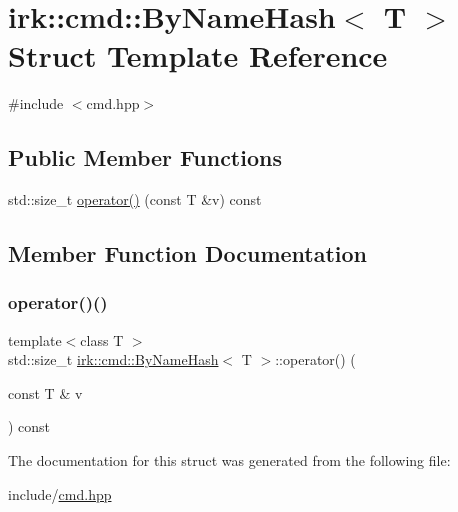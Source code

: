 \hypertarget{structirk_1_1cmd_1_1ByNameHash}{}\section{irk\+:\+:cmd\+:\+:By\+Name\+Hash$<$ T $>$ Struct Template Reference}
\label{structirk_1_1cmd_1_1ByNameHash}


{\ttfamily \#include $<$cmd.\+hpp$>$}

\subsection*{Public Member Functions}
\begin{DoxyCompactItemize}
\item 
std\+::size\+\_\+t \mbox{\hyperlink{structirk_1_1cmd_1_1ByNameHash_a297bd1c903c1bd156e530b8742305764}{operator()}} (const T \&v) const
\end{DoxyCompactItemize}


\subsection{Member Function Documentation}
\mbox{\label{structirk_1_1cmd_1_1ByNameHash_a297bd1c903c1bd156e530b8742305764}} 
\subsubsection{\texorpdfstring{operator()()}{operator()()}}
{\footnotesize\ttfamily template$<$class T $>$ \\
std\+::size\+\_\+t \mbox{\hyperlink{structirk_1_1cmd_1_1ByNameHash}{irk\+::cmd\+::\+By\+Name\+Hash}}$<$ T $>$\+::operator() (\begin{DoxyParamCaption}\item[{const T \&}]{v }\end{DoxyParamCaption}) const\hspace{0.3cm}{\ttfamily [inline]}}



The documentation for this struct was generated from the following file\+:\begin{DoxyCompactItemize}
\item 
include/\mbox{\hyperlink{cmd_8hpp}{cmd.\+hpp}}\end{DoxyCompactItemize}
